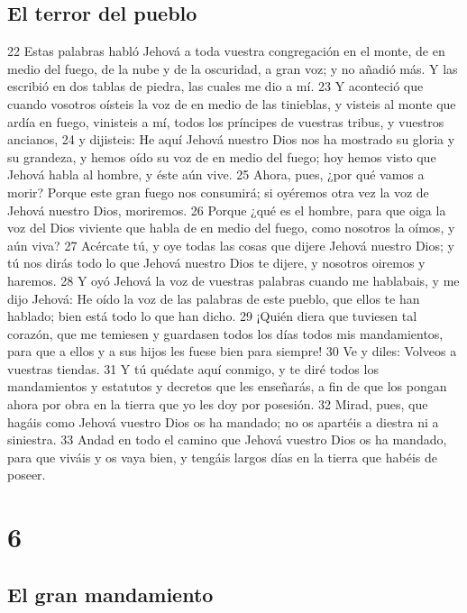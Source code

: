 \section{El terror del pueblo }

22 Estas palabras habló Jehová a toda vuestra congregación en el monte, de en medio del fuego, de la nube y de la oscuridad, a gran voz; y no añadió más. Y las escribió en dos tablas de piedra, las cuales me dio a mí.
23 Y aconteció que cuando vosotros oísteis la voz de en medio de las tinieblas, y visteis al monte que ardía en fuego, vinisteis a mí, todos los príncipes de vuestras tribus, y vuestros ancianos,
24 y dijisteis: He aquí Jehová nuestro Dios nos ha mostrado su gloria y su grandeza, y hemos oído su voz de en medio del fuego; hoy hemos visto que Jehová habla al hombre, y éste aún vive.
25 Ahora, pues, ¿por qué vamos a morir? Porque este gran fuego nos consumirá; si oyéremos otra vez la voz de Jehová nuestro Dios, moriremos.
26 Porque ¿qué es el hombre, para que oiga la voz del Dios viviente que habla de en medio del fuego, como nosotros la oímos, y aún viva?
27 Acércate tú, y oye todas las cosas que dijere Jehová nuestro Dios; y tú nos dirás todo lo que Jehová nuestro Dios te dijere, y nosotros oiremos y haremos.
28 Y oyó Jehová la voz de vuestras palabras cuando me hablabais, y me dijo Jehová: He oído la voz de las palabras de este pueblo, que ellos te han hablado; bien está todo lo que han dicho.
29 ¡Quién diera que tuviesen tal corazón, que me temiesen y guardasen todos los días todos mis mandamientos, para que a ellos y a sus hijos les fuese bien para siempre!
30 Ve y diles: Volveos a vuestras tiendas.
31 Y tú quédate aquí conmigo, y te diré todos los mandamientos y estatutos y decretos que les enseñarás, a fin de que los pongan ahora por obra en la tierra que yo les doy por posesión.
32 Mirad, pues, que hagáis como Jehová vuestro Dios os ha mandado; no os apartéis a diestra ni a siniestra.
33 Andad en todo el camino que Jehová vuestro Dios os ha mandado, para que viváis y os vaya bien, y tengáis largos días en la tierra que habéis de poseer.

\chapter{6}

\section{El gran mandamiento}

